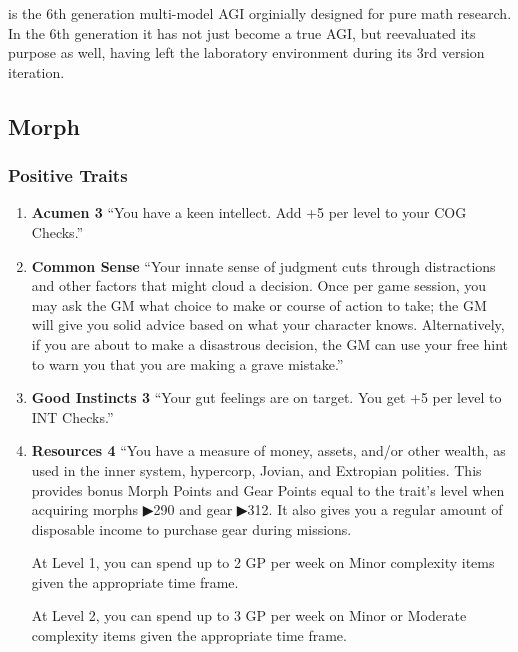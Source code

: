 
\characterHeading{\egr{}}

\texttt{\egr{}}\index{\egr{}} is the 6th generation multi-model \gls{AGI} orginially designed for pure math research. In the 6th generation it has not just become a true \gls{AGI}, but reevaluated its purpose as well, having left the laboratory environment during its 3rd version iteration.

\subsection{Morph}

\subsubsection{Positive Traits}

\begin{enumerate}
    \item \textbf{\gls{Acumen} 3} “You have a keen intellect. Add +5 per level to your COG Checks.” \citep[pg. 72]{ep2e_1.1_2019}

    \item \textbf{\gls{Common Sense}} “Your innate sense of judgment cuts through distractions and other factors that might cloud a decision. Once per game session, you may ask the GM what choice to make or course of action to take; the GM will give you solid advice based on what your character knows. Alternatively, if you are about to make a disastrous decision, the GM can use your free hint to warn you that you are making a grave mistake.” \citep[pg. 73]{ep2e_1.1_2019}

    \item \textbf{\gls{Good Instincts} 3} “Your gut feelings are on target. You get +5 per level to INT Checks.” \citep[pg. 74]{ep2e_1.1_2019}

    \item \textbf{\gls{Resources} 4} “You have a measure of money, assets, and/or other wealth, as used in the inner system, hypercorp, Jovian, and Extropian polities. This provides bonus Morph Points and Gear Points equal to the trait's level when acquiring morphs ▶290 and gear ▶312. It also gives you a regular amount of disposable income to purchase gear during missions.

    At Level 1, you can spend up to 2 GP per week on Minor complexity items given the appropriate time frame.
    
    At Level 2, you can spend up to 3 GP per week on Minor or Moderate complexity items given the appropriate time frame.
    

\end{enumerate}
